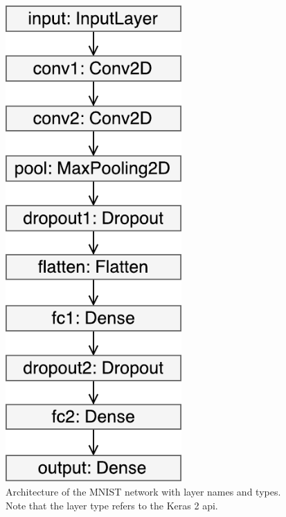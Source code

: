 \begin{figure}
    \begin{minipage}{0.5\textwidth}
        \centering
            \includegraphics[width=0.6\textwidth]{fig/mnist_keras.pdf}
            \caption{Architecture of the MNIST network with layer names and types. Note that the layer type refers to the Keras 2 \acrshort{api}.}
            \label{fig:mnist-architecture}
    \end{minipage}
    \begin{minipage}{0.4\textwidth}
        \centering

\end{minipage}
\end{figure}
